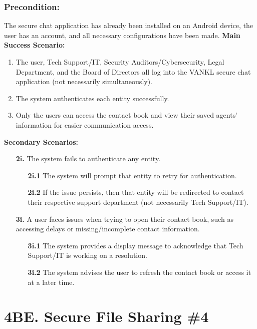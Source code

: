 \documentclass[]{article}
\begin{document}
\subsubsection*{Precondition:} The secure chat application has already been installed on an Android device, the user has an account, and all necessary configurations have been made.\newline\newline
\textbf{Main Success Scenario:}
\begin{enumerate}
	\item The user, Tech Support/IT, Security Auditors/Cybersecurity, Legal Department, and the Board of Directors all log into the VANKL secure chat application (not necessarily simultaneously).
	\item The system authenticates each entity successfully.
	\item Only the users can access the contact book and view their saved agents’ information for easier communication access.
\end{enumerate}
\textbf{Secondary Scenarios:}
\begin{enumerate}
	\item[\textbf{2i.}] The system fails to authenticate any entity.
		\begin{enumerate}
			\item[\textbf{2i.1}] The system will prompt that entity to retry for authentication.
			\item[\textbf{2i.2}] If the issue persists, then that entity will be redirected to contact their respective support department (not necessarily Tech Support/IT).
		\end{enumerate}
	\item[\textbf{3i.}] A user faces issues when trying to open their contact book, such as accessing delays or missing/incomplete contact information.
		\begin{enumerate}
			\item[\textbf{3i.1}] The system provides a display message to acknowledge that Tech Support/IT is working on a resolution.
			\item[\textbf{3i.2}] The system advises the user to refresh the contact book or access it at a later time.
		\end{enumerate}
\end{enumerate}

\section*{4BE. Secure File Sharing \#4}
\end{document}
